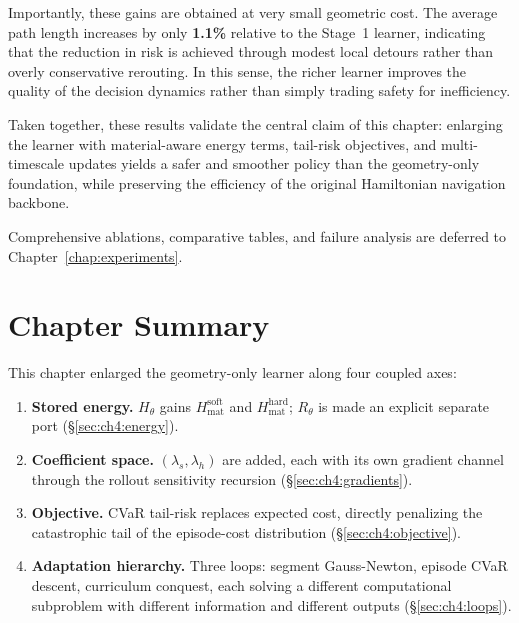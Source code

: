 Importantly, these gains are obtained at very small geometric cost. The average
path length increases by only \textbf{1.1\%} relative to the Stage~1 learner,
indicating that the reduction in risk is achieved through modest local detours
rather than overly conservative rerouting. In this sense, the richer learner
improves the quality of the decision dynamics rather than simply trading safety
for inefficiency.

Taken together, these results validate the central claim of this chapter:
enlarging the learner with material-aware energy terms, tail-risk objectives,
and multi-timescale updates yields a safer and smoother policy than the
geometry-only foundation, while preserving the efficiency of the original
Hamiltonian navigation backbone.

Comprehensive ablations, comparative tables, and failure analysis are deferred
to Chapter~\ref{chap:experiments}.

\section{Chapter Summary}
\label{sec:ch4:summary}

This chapter enlarged the geometry-only learner along four coupled axes:

\begin{enumerate}
  \item \textbf{Stored energy.}
        $H_\theta$ gains $H_{\mathrm{mat}}^{\mathrm{soft}}$ and
        $H_{\mathrm{mat}}^{\mathrm{hard}}$; $R_\theta$ is made an
        explicit separate port (\S\ref{sec:ch4:energy}).
  \item \textbf{Coefficient space.}
        $(\lambda_s,\lambda_h)$ are added, each with its own gradient
        channel through the rollout sensitivity recursion
        (\S\ref{sec:ch4:gradients}).
  \item \textbf{Objective.}
        CVaR tail-risk replaces expected cost, directly penalizing
        the catastrophic tail of the episode-cost distribution
        (\S\ref{sec:ch4:objective}).
  \item \textbf{Adaptation hierarchy.}
        Three loops: segment Gauss-Newton, episode CVaR descent,
        curriculum conquest, each solving a different computational
        subproblem with different information and different outputs
        (\S\ref{sec:ch4:loops}).
\end{enumerate}

